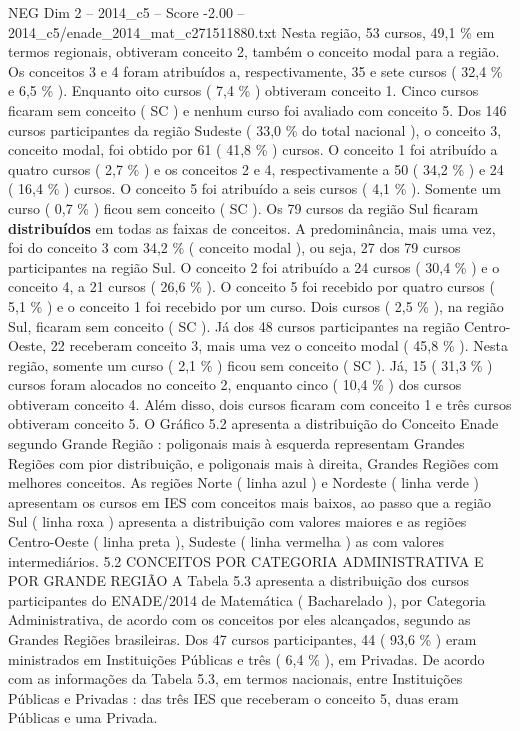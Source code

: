 \begin{textsample}{NEG Dim 2 – 2014\_c5 – Score -2.00 – 2014\_c5/enade\_2014\_mat\_c271511880.txt}
Nesta região, 53 cursos, 49,1 \% em termos regionais, obtiveram conceito 2, também o conceito modal para a região.
Os conceitos 3 e 4 foram atribuídos a, respectivamente, 35 e sete cursos ( 32,4 \% e 6,5 \% ).
Enquanto oito cursos ( 7,4 \% ) obtiveram conceito 1.
Cinco cursos ficaram sem conceito ( SC ) e nenhum curso foi avaliado com conceito 5.
Dos 146 cursos participantes da região Sudeste ( 33,0 \% do total nacional ), o conceito 3, conceito modal, foi obtido por 61 ( 41,8 \% ) cursos.
O conceito 1 foi atribuído a quatro cursos ( 2,7 \% ) e os conceitos 2 e 4, respectivamente a 50 ( 34,2 \% ) e 24 ( 16,4 \% ) cursos.
O conceito 5 foi atribuído a seis cursos ( 4,1 \% ).
Somente um curso ( 0,7 \% ) ficou sem conceito ( SC ).
Os 79 cursos da região Sul ficaram \textbf{distribuídos} em todas as faixas de conceitos.
A predominância, mais uma vez, foi do conceito 3 com 34,2 \% ( conceito modal ), ou seja, 27 dos 79 cursos participantes na região Sul.
O conceito 2 foi atribuído a 24 cursos ( 30,4 \% ) e o conceito 4, a 21 cursos ( 26,6 \% ).
O conceito 5 foi recebido por quatro cursos ( 5,1 \% ) e o conceito 1 foi recebido por um curso.
Dois cursos ( 2,5 \% ), na região Sul, ficaram sem conceito ( SC ).
Já dos 48 cursos participantes na região Centro-Oeste, 22 receberam conceito 3, mais uma vez o conceito modal ( 45,8 \% ).
Nesta região, somente um curso ( 2,1 \% ) ficou sem conceito ( SC ).
Já, 15 ( 31,3 \% ) cursos foram alocados no conceito 2, enquanto cinco ( 10,4 \% ) dos cursos obtiveram conceito 4.
Além disso, dois cursos ficaram com conceito 1 e três cursos obtiveram conceito 5.
O Gráfico 5.2 apresenta a distribuição do Conceito Enade segundo Grande Região : poligonais mais à esquerda representam Grandes Regiões com pior distribuição, e poligonais mais à direita, Grandes Regiões com melhores conceitos.
As regiões Norte ( linha azul ) e Nordeste ( linha verde ) apresentam os cursos em IES com conceitos mais baixos, ao passo que a região Sul ( linha roxa ) apresenta a distribuição com valores maiores e as regiões Centro-Oeste ( linha preta ), Sudeste ( linha vermelha ) as com valores intermediários. 5.2 CONCEITOS POR CATEGORIA ADMINISTRATIVA E POR GRANDE REGIÃO A Tabela 5.3 apresenta a distribuição dos cursos participantes do ENADE/2014 de Matemática ( Bacharelado ), por Categoria Administrativa, de acordo com os conceitos por eles alcançados, segundo as Grandes Regiões brasileiras.
Dos 47 cursos participantes, 44 ( 93,6 \% ) eram ministrados em Instituições Públicas e três ( 6,4 \% ), em Privadas.
De acordo com as informações da Tabela 5.3, em termos nacionais, entre Instituições Públicas e Privadas : das três IES que receberam o conceito 5, duas eram Públicas e uma Privada.

\end{textsample}
